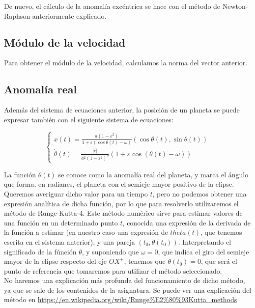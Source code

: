 \documentclass[12pt]{article}
\begin{document}
De nuevo, el cálculo de la anomalía excéntrica se hace con el método
de Newton-Raphson anteriormente explicado.

\subsection{Módulo de la velocidad}

Para obtener el módulo de la velocidad, calculamos la norma del
vector anterior.

\subsection{Anomalía real}

Además del sistema de ecuaciones anterior, la posición de un planeta
se puede expresar también con el siguiente sistema de ecuaciones:

\begin{equation}
  \left\{
    \begin{array}{l}
      x(t) = \frac{a(1 - \varepsilon^2)}{1 + \varepsilon(\cos{\theta(t)} - \omega)}(\cos{\theta(t)}, \sin{\theta(t)})\\
      \dot{\theta}(t) = \frac{|c|}{a^2(1 - \varepsilon^2)^2}(1 + \varepsilon \cos{(\theta(t) - \omega)})
    \end{array}
  \right.
\end{equation}

La función $\theta(t)$ se conoce como la anomalía real del planeta, y
marca el ángulo que forma, en radianes, el planeta con el semieje
mayor positivo de la elipse. Queremos averiguar dicho valor para un
tiempo $t$, pero no podemos obtener una expresión analítica de dicha
función, por lo que para resolverlo utilizaremos el método de
Runge-Kutta-4. Este método numérico sirve para estimar valores de una
función en un determinado punto $t$, conocida una expresión de la
derivada de la función a estimar (en nuestro caso una expresión de
$\dot{theta}(t)$, que tenemos escrita en el sistema anterior), y una
pareja $(t_0, \theta(t_0))$. Interpretando el significado de la
fúnción $\theta$, y suponiendo que $\omega = 0$, que indica el giro
del semieje mayor de la elipse respecto del eje $OX^{+}$, tenemos que
$\theta(t_0) = 0$, que será el punto de referencia que tomaremos
para utilizar el método seleccionado.\\

No haremos una explicación más profunda del funcionamiento de dicho
método, ya que se sale de los contenidos de la asignatura. Se puede
ver una explicación del método en
\url{https://en.wikipedia.org/wiki/Runge%E2%80%93Kutta_methods}
\end{document}
